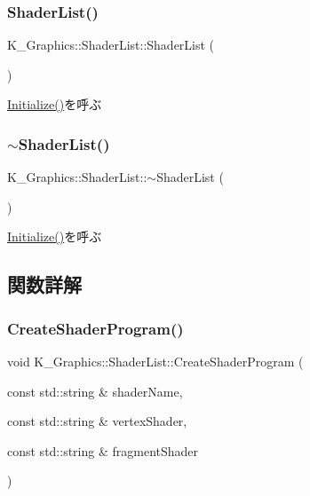 \subsubsection{\texorpdfstring{Shader\+List()}{ShaderList()}}
{\footnotesize\ttfamily K\+\_\+\+Graphics\+::\+Shader\+List\+::\+Shader\+List (\begin{DoxyParamCaption}{ }\end{DoxyParamCaption})}



\mbox{\hyperlink{class_k___graphics_1_1_shader_list_af5d3c07fdd3519e2c79792a462e26fc3}{Initialize()}}を呼ぶ 

\mbox{\label{class_k___graphics_1_1_shader_list_a77ff9ce6e8e54ca516fd5ac4281688f6}} 
\subsubsection{\texorpdfstring{$\sim$\+Shader\+List()}{~ShaderList()}}
{\footnotesize\ttfamily K\+\_\+\+Graphics\+::\+Shader\+List\+::$\sim$\+Shader\+List (\begin{DoxyParamCaption}{ }\end{DoxyParamCaption})}



\mbox{\hyperlink{class_k___graphics_1_1_shader_list_af5d3c07fdd3519e2c79792a462e26fc3}{Initialize()}}を呼ぶ 



\subsection{関数詳解}
\mbox{\label{class_k___graphics_1_1_shader_list_ad59998f21d1830a48ce6a336813218aa}} 
\subsubsection{\texorpdfstring{Create\+Shader\+Program()}{CreateShaderProgram()}}
{\footnotesize\ttfamily void K\+\_\+\+Graphics\+::\+Shader\+List\+::\+Create\+Shader\+Program (\begin{DoxyParamCaption}\item[{const std\+::string \&}]{shader\+Name,  }\item[{const std\+::string \&}]{vertex\+Shader,  }\item[{const std\+::string \&}]{fragment\+Shader }\end{DoxyParamCaption})}



